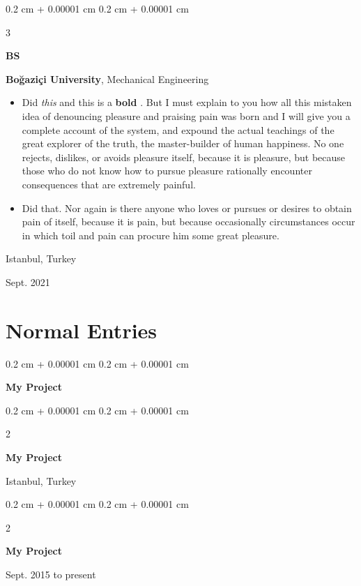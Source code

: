 \documentclass[10pt, letterpaper]{article}
\newenvironment{highlights}{
    \begin{itemize}[
        topsep=0.10 cm,
        parsep=0.10 cm,
        partopsep=0pt,
        itemsep=0pt,
        leftmargin=0.4 cm + 10pt
    ]
}{
    \end{itemize}
} %
\newenvironment{onecolentry}{
    \begin{adjustwidth}{
        0.2 cm + 0.00001 cm
    }{
        0.2 cm + 0.00001 cm
    }
}{
    \end{adjustwidth}
} %
\newenvironment{twocolentry}[2][]{
    \onecolentry
    \def\secondColumn{#2}
    \setcolumnwidth{\fill, 4.5 cm}
    \begin{paracol}{2}
}{
    \switchcolumn \raggedleft \secondColumn
    \end{paracol}
    \endonecolentry
} %
\newenvironment{threecolentry}[3][]{
    \onecolentry
    \def\thirdColumn{#3}
    \setcolumnwidth{1 cm, \fill, 4.5 cm}
    \begin{paracol}{3}
    {\raggedright #2} \switchcolumn
}{
    \switchcolumn \raggedleft \thirdColumn
    \end{paracol}
    \endonecolentry
} %
\let\hrefWithoutArrow\href
\renewcommand{\href}[2]{\hrefWithoutArrow{#1}{\mbox{\ifthenelse{\equal{#2}{}}{ }{#2 }\raisebox{.15ex}{\footnotesize \faExternalLink*}}}}
\begin{document}
        \vspace{0.2 cm}

        \begin{threecolentry}{\textbf{BS}}{
            Istanbul, Turkey

        Sept. 2021
        }
            \textbf{Boğaziçi University}, Mechanical Engineering
            \begin{highlights}
                \item Did \textit{this} and this is a \textbf{bold} \href{https://example.com}{link}. But I must explain to you how all this mistaken idea of denouncing pleasure and praising pain was born and I will give you a complete account of the system, and expound the actual teachings of the great explorer of the truth, the master-builder of human happiness. No one rejects, dislikes, or avoids pleasure itself, because it is pleasure, but because those who do not know how to pursue pleasure rationally encounter consequences that are extremely painful.
                \item Did that. Nor again is there anyone who loves or pursues or desires to obtain pain of itself, because it is pain, but because occasionally circumstances occur in which toil and pain can procure him some great pleasure.
            \end{highlights}
        \end{threecolentry}


    
    \section{Normal Entries}

        
        \begin{onecolentry}
            \textbf{My Project}
        \end{onecolentry}


        \vspace{0.2 cm}

        \begin{twocolentry}{
            Istanbul, Turkey
        }
            \textbf{My Project}
        \end{twocolentry}


        \vspace{0.2 cm}

        \begin{twocolentry}{
            Sept. 2015 to present
        }
            \textbf{My Project}
        \end{twocolentry}
\end{document}
